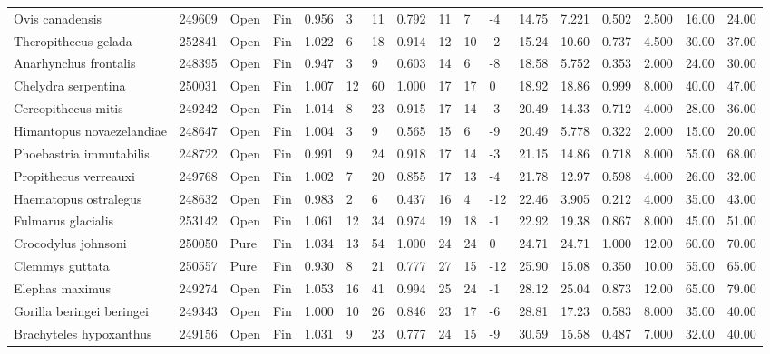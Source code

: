\documentclass[10pt,a4paper]{amsart}
\theoremstyle{definition}
\theoremstyle{remark}
\numberwithin{equation}{section}
\begin{document}
\begin{table}[ht]
{\begin{tabular}{lllllllllllllllll}
Ovis canadensis & 249609 & Open & Fin & 0.956 & 3 & 11 & 0.792 & 11 & 7 & -4 & 14.75 & 7.221 & 0.502 & 2.500 & 16.00 & 24.00 \\
Theropithecus gelada & 252841 & Open & Fin & 1.022 & 6 & 18 & 0.914 & 12 & 10 & -2 & 15.24 & 10.60 & 0.737 & 4.500 & 30.00 & 37.00 \\
Anarhynchus frontalis & 248395 & Open & Fin & 0.947 & 3 & 9 & 0.603 & 14 & 6 & -8 & 18.58 & 5.752 & 0.353 & 2.000 & 24.00 & 30.00 \\
Chelydra serpentina & 250031 & Open & Fin & 1.007 & 12 & 60 & 1.000 & 17 & 17 & 0 & 18.92 & 18.86 & 0.999 & 8.000 & 40.00 & 47.00 \\
Cercopithecus mitis & 249242 & Open & Fin & 1.014 & 8 & 23 & 0.915 & 17 & 14 & -3 & 20.49 & 14.33 & 0.712 & 4.000 & 28.00 & 36.00 \\
Himantopus novaezelandiae & 248647 & Open & Fin & 1.004 & 3 & 9 & 0.565 & 15 & 6 & -9 & 20.49 & 5.778 & 0.322 & 2.000 & 15.00 & 20.00 \\
Phoebastria immutabilis & 248722 & Open & Fin & 0.991 & 9 & 24 & 0.918 & 17 & 14 & -3 & 21.15 & 14.86 & 0.718 & 8.000 & 55.00 & 68.00 \\
Propithecus verreauxi & 249768 & Open & Fin & 1.002 & 7 & 20 & 0.855 & 17 & 13 & -4 & 21.78 & 12.97 & 0.598 & 4.000 & 26.00 & 32.00 \\
Haematopus ostralegus & 248632 & Open & Fin & 0.983 & 2 & 6 & 0.437 & 16 & 4 & -12 & 22.46 & 3.905 & 0.212 & 4.000 & 35.00 & 43.00 \\
Fulmarus glacialis & 253142 & Open & Fin & 1.061 & 12 & 34 & 0.974 & 19 & 18 & -1 & 22.92 & 19.38 & 0.867 & 8.000 & 45.00 & 51.00 \\
Crocodylus johnsoni & 250050 & Pure & Fin & 1.034 & 13 & 54 & 1.000 & 24 & 24 & 0 & 24.71 & 24.71 & 1.000 & 12.00 & 60.00 & 70.00 \\
Clemmys guttata & 250557 & Pure & Fin & 0.930 & 8 & 21 & 0.777 & 27 & 15 & -12 & 25.90 & 15.08 & 0.350 & 10.00 & 55.00 & 65.00 \\
Elephas maximus & 249274 & Open & Fin & 1.053 & 16 & 41 & 0.994 & 25 & 24 & -1 & 28.12 & 25.04 & 0.873 & 12.00 & 65.00 & 79.00 \\
Gorilla beringei beringei & 249343 & Open & Fin & 1.000 & 10 & 26 & 0.846 & 23 & 17 & -6 & 28.81 & 17.23 & 0.583 & 8.000 & 35.00 & 40.00 \\
Brachyteles hypoxanthus & 249156 & Open & Fin & 1.031 & 9 & 23 & 0.777 & 24 & 15 & -9 & 30.59 & 15.58 & 0.487 & 7.000 & 32.00 & 40.00 \\

\end{tabular}}
\end{table}
\end{document}
